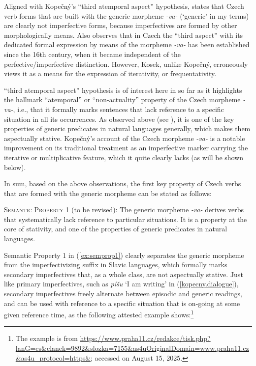 \documentclass[output=paper,colorlinks,citecolor=brown]{langscibook}
\begin{document}
Aligned with Kopečný's ``third atemporal aspect'' hypothesis,
\citet[325]{lamprecht1986historicka} states that Czech verb forms
that are built with the generic morpheme \textit{-va-} (`generic' in my terms)
are clearly not imperfective forms, because imperfectives are formed by other morphologically means.
Also \citet[152]{Kosek2014} observes that in Czech the ``third aspect'' with its dedicated formal expression by means of the morpheme \textit{-va-} has been established since the 16th century,
when it became independent of the perfective/imperfective distinction. However, Kosek, unlike Kopečný, erroneously views it as a means for the expression of iterativity, or frequentativity.



 ``third atemporal aspect'' hypothesis is of interest here in so far as it highlights the hallmark ``atemporal'' or ``non-actuality'' property of the Czech morpheme \textit{-va-}, i.e., that it formally marks sentences that lack reference to a specific situation in all its occurrences.  As observed above (see ), it is one of the key properties
of generic predicates in natural languages generally, which makes them aspectually stative. Kopečný's account of the Czech morpheme \textit{-va-} is a notable improvement on its traditional
treatment as an imperfective marker carrying the  iterative or multiplicative feature, which it quite clearly lacks
(as will be shown below).

In sum, based on the above observations, the first key property of Czech verbs that are formed with the generic morpheme can be stated as follows:

\eanoraggedright\label{ex:semprop1}
\textsc{Semantic Property 1} (to be revised): The generic morpheme \textit{-va-} derives verbs that systematically lack reference to particular situations. It is a property at the core of stativity,  and one of the properties of generic predicates in natural languages.
\z

\noindent
Semantic Property 1 in (\ref{ex:semprop1}) clearly separates the generic morpheme  from the imperfectivizing suffix in Slavic languages, which formally marks secondary imperfectives that, as a whole class, are not  aspectually stative. Just like primary imperfectives, such as \textit{píšu} `I am writing' in (\ref{kopecny.dialogue}), secondary imperfectives freely alternate between episodic and generic readings, and can be used with reference to a specific situation that is on-going at some given reference time, as the following attested example shows:\footnote{The example is from \url{https://www.praha11.cz/redakce/tisk.php?lanG=cs&clanek=9892&slozka=7155&as4uOriginalDomain=www.praha11.cz&as4u_protocol=https&}; accessed on August 15, 2025.}
\end{document}
